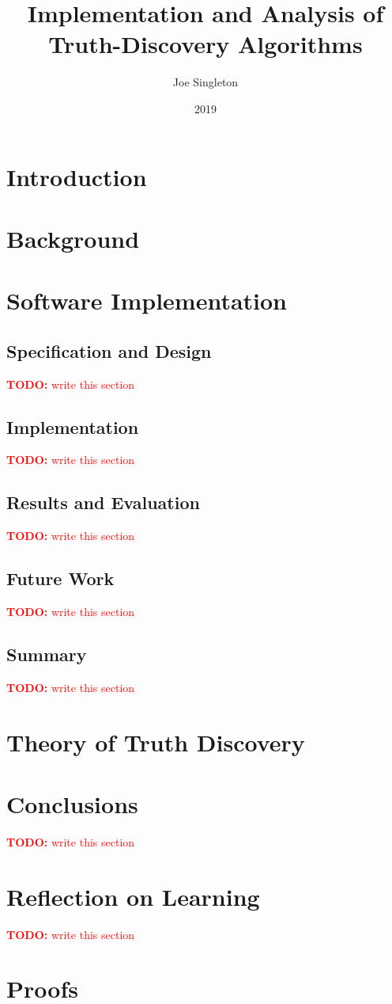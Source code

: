 \documentclass[12pt]{report}
\date{2019}
\author{Joe Singleton}
\title{Implementation and Analysis of Truth-Discovery Algorithms}
\theoremstyle{definition} \newtheorem{definition}{Definition}
\theoremstyle{definition} \newtheorem{example}{Example}
\theoremstyle{plain} \newtheorem{axiom}{Axiom}
\theoremstyle{plain} \newtheorem*{remark}{Remark}
\theoremstyle{remark} \newtheorem*{notation}{Notation}
\theoremstyle{plain} \newtheorem{lemma}{Lemma}
\theoremstyle{plain} \newtheorem{theorem}{Theorem}
\theoremstyle{plain} \newtheorem{proposition}{Proposition}
\newcommand{\todo}[1] {
    \textcolor{red}{
        \textbf{TODO:} #1
    }
}
\begin{document}
\maketitle



\tableofcontents

\chapter{Introduction}


\chapter{Background}


\chapter{Software Implementation}
\section{Specification and Design}
\todo{write this section}
\section{Implementation}
\todo{write this section}
\section{Results and Evaluation}
\todo{write this section}
\section{Future Work}
\todo{write this section}
\section{Summary}
\todo{write this section}

\chapter{Theory of Truth Discovery}


\chapter{Conclusions}
\todo{write this section}
\chapter{Reflection on Learning}
\todo{write this section}

\printbibliography[heading=bibintoc]

\appendix
\chapter{Proofs}
\label{appendix:proofs}

\end{document}
